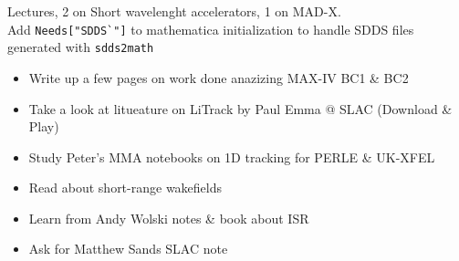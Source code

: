 
Lectures, 2 on Short wavelenght accelerators, 1 on MAD-X.\\
Add \verb|Needs["SDDS`"]| to mathematica initialization to handle SDDS files generated with \verb|sdds2math|\\


\begin{itemize}
    \item Write up a few pages on work done anazizing MAX-IV BC1 \& BC2
    \item Take a look at litueature on LiTrack by Paul Emma @ SLAC (Download \& Play)
    \item Study Peter's MMA notebooks on 1D tracking for PERLE \& UK-XFEL
    \item Read about short-range wakefields
    \item Learn from Andy Wolski notes \& book about ISR
    \item Ask for Matthew Sands SLAC note
\end{itemize}